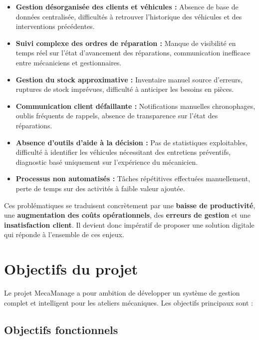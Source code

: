 \begin{itemize}
    \item \textbf{Gestion désorganisée des clients et véhicules :} Absence de base de données centralisée, difficultés à retrouver l'historique des véhicules et des interventions précédentes.
    
    \item \textbf{Suivi complexe des ordres de réparation :} Manque de visibilité en temps réel sur l'état d'avancement des réparations, communication inefficace entre mécaniciens et gestionnaires.
    
    \item \textbf{Gestion du stock approximative :} Inventaire manuel source d'erreurs, ruptures de stock imprévues, difficulté à anticiper les besoins en pièces.
    
    \item \textbf{Communication client défaillante :} Notifications manuelles chronophages, oublis fréquents de rappels, absence de transparence sur l'état des réparations.
    
    \item \textbf{Absence d'outils d'aide à la décision :} Pas de statistiques exploitables, difficulté à identifier les véhicules nécessitant des entretiens préventifs, diagnostic basé uniquement sur l'expérience du mécanicien.
    
    \item \textbf{Processus non automatisés :} Tâches répétitives effectuées manuellement, perte de temps sur des activités à faible valeur ajoutée.
\end{itemize}

Ces problématiques se traduisent concrètement par une \textbf{baisse de productivité}, une \textbf{augmentation des coûts opérationnels}, des \textbf{erreurs de gestion} et une \textbf{insatisfaction client}. Il devient donc impératif de proposer une solution digitale qui réponde à l'ensemble de ces enjeux.

\section*{Objectifs du projet}

Le projet MecaManage a pour ambition de développer un système de gestion complet et intelligent pour les ateliers mécaniques. Les objectifs principaux sont :

\subsection*{Objectifs fonctionnels}

